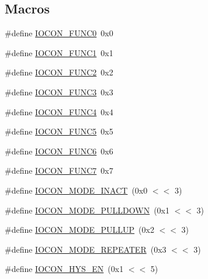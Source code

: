 \subsection*{Macros}
\begin{DoxyCompactItemize}
\item 
\#define \hyperlink{group___i_o_c_o_n__17_x_x__40_x_x_gab08f72eae45dd5656aeca24c346c8626}{I\+O\+C\+O\+N\+\_\+\+F\+U\+N\+C0}~0x0
\item 
\#define \hyperlink{group___i_o_c_o_n__17_x_x__40_x_x_gab6449233bd56957c684b9ad694606e3a}{I\+O\+C\+O\+N\+\_\+\+F\+U\+N\+C1}~0x1
\item 
\#define \hyperlink{group___i_o_c_o_n__17_x_x__40_x_x_ga43ebb7abf055ce2491fbba5ef72f6fc7}{I\+O\+C\+O\+N\+\_\+\+F\+U\+N\+C2}~0x2
\item 
\#define \hyperlink{group___i_o_c_o_n__17_x_x__40_x_x_gace4708e511b3aa9c352600604331bec0}{I\+O\+C\+O\+N\+\_\+\+F\+U\+N\+C3}~0x3
\item 
\#define \hyperlink{group___i_o_c_o_n__17_x_x__40_x_x_gac621b96a2bd1ee57a83ff1af98287a8d}{I\+O\+C\+O\+N\+\_\+\+F\+U\+N\+C4}~0x4
\item 
\#define \hyperlink{group___i_o_c_o_n__17_x_x__40_x_x_ga0f9630599f40a3f96a5887c7e65508a9}{I\+O\+C\+O\+N\+\_\+\+F\+U\+N\+C5}~0x5
\item 
\#define \hyperlink{group___i_o_c_o_n__17_x_x__40_x_x_ga6284e27c6e5df6bc9f37c482e736a1d3}{I\+O\+C\+O\+N\+\_\+\+F\+U\+N\+C6}~0x6
\item 
\#define \hyperlink{group___i_o_c_o_n__17_x_x__40_x_x_ga38efe875290e90d2f4185cb0ffe33e03}{I\+O\+C\+O\+N\+\_\+\+F\+U\+N\+C7}~0x7
\item 
\#define \hyperlink{group___i_o_c_o_n__17_x_x__40_x_x_gafc593aafe607c88c52864ecb7586ffe9}{I\+O\+C\+O\+N\+\_\+\+M\+O\+D\+E\+\_\+\+I\+N\+A\+C\+T}~(0x0 $<$$<$ 3)
\item 
\#define \hyperlink{group___i_o_c_o_n__17_x_x__40_x_x_ga270261df49234519bfd09e076dfcec6c}{I\+O\+C\+O\+N\+\_\+\+M\+O\+D\+E\+\_\+\+P\+U\+L\+L\+D\+O\+W\+N}~(0x1 $<$$<$ 3)
\item 
\#define \hyperlink{group___i_o_c_o_n__17_x_x__40_x_x_gad8fe947d8e7076d6cec01a5b30261141}{I\+O\+C\+O\+N\+\_\+\+M\+O\+D\+E\+\_\+\+P\+U\+L\+L\+U\+P}~(0x2 $<$$<$ 3)
\item 
\#define \hyperlink{group___i_o_c_o_n__17_x_x__40_x_x_ga53d705841cc362c6f43ffc1370d71726}{I\+O\+C\+O\+N\+\_\+\+M\+O\+D\+E\+\_\+\+R\+E\+P\+E\+A\+T\+E\+R}~(0x3 $<$$<$ 3)
\item 
\#define \hyperlink{group___i_o_c_o_n__17_x_x__40_x_x_gafb7c408ac1f52b7b7e46fde3061fe0b7}{I\+O\+C\+O\+N\+\_\+\+H\+Y\+S\+\_\+\+E\+N}~(0x1 $<$$<$ 5)
$$
\end{DoxyCompactItemize}
